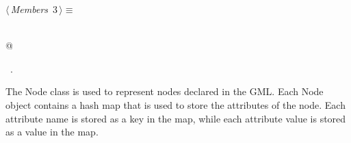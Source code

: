 \documentclass[a4paper]{report}
\begin{document}
\begin{flushleft} \small
\begin{minipage}{\linewidth}\label{scrap3}\raggedright\small
{} $\langle\,${\itshape Members}\nobreak\ {\footnotesize {3}}$\,\rangle\equiv$
\vspace{-1ex}
\begin{list}{}{} \item
\mbox{}\verb@@\\
\mbox{}@\\
\mbox{}\verb@@{\NWsep}
\end{list}
\vspace{-1.5ex}
\footnotesize
\begin{list}{}{\setlength{\itemsep}{-\parsep}\setlength{\itemindent}{-\leftmargin}}
\item \NWtxtMacroRefIn\ .

\item{}
\end{list}
\end{minipage}\vspace{4ex}
\end{flushleft}
The Node class is used to represent nodes declared in the GML. Each Node object contains a hash map that is used to store the attributes of the node. 
Each attribute name is stored as a key in the map, while each attribute value is stored as a value in the map.
\end{document}

